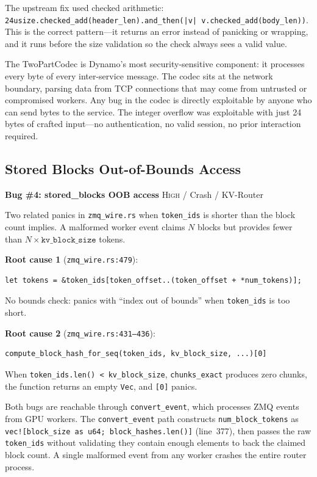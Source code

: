 The upstream fix used checked arithmetic: \texttt{24usize.checked\_add(header\_len).and\_then(|v| v.checked\_add(body\_len))}. This is the correct pattern---it returns an error instead of panicking or wrapping, and it runs before the size validation so the check always sees a valid value.

\begin{notebox}
The TwoPartCodec is Dynamo's most security-sensitive component: it processes every byte of every inter-service message. The codec sits at the network boundary, parsing data from TCP connections that may come from untrusted or compromised workers. Any bug in the codec is directly exploitable by anyone who can send bytes to the service. The integer overflow was exploitable with just 24 bytes of crafted input---no authentication, no valid session, no prior interaction required.
\end{notebox}

\subsection{Stored Blocks Out-of-Bounds Access}

\begin{bugbox}
\textbf{Bug \#4: stored\_blocks OOB access} \hfill \textsc{High} / Crash / KV-Router

Two related panics in \texttt{zmq\_wire.rs} when \texttt{token\_ids} is shorter than the block count implies. A malformed worker event claims $N$ blocks but provides fewer than $N \times \texttt{kv\_block\_size}$ tokens.

\medskip
\textbf{Root cause 1} (\texttt{zmq\_wire.rs:479}):
\begin{verbatim}
let tokens = &token_ids[token_offset..(token_offset + *num_tokens)];
\end{verbatim}
No bounds check: panics with ``index out of bounds'' when \texttt{token\_ids} is too short.

\medskip
\textbf{Root cause 2} (\texttt{zmq\_wire.rs:431--436}):
\begin{verbatim}
compute_block_hash_for_seq(token_ids, kv_block_size, ...)[0]
\end{verbatim}
When \texttt{token\_ids.len() < kv\_block\_size}, \texttt{chunks\_exact} produces zero chunks, the function returns an empty \texttt{Vec}, and \texttt{[0]} panics.
\end{bugbox}

Both bugs are reachable through \texttt{convert\_event}, which processes ZMQ events from GPU workers. The \texttt{convert\_event} path constructs \texttt{num\_block\_tokens} as \texttt{vec![block\_size as u64; block\_hashes.len()]} (line~377), then passes the raw \texttt{token\_ids} without validating they contain enough elements to back the claimed block count. A single malformed event from any worker crashes the entire router process.

